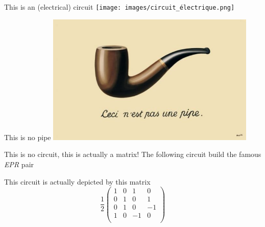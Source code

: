 \begin{frame}{This is an (electrical) circuit}
    \centering
    \texttt{[image: images/circuit\_électrique.png]}
\end{frame}

\begin{frame}{This is no pipe}
    \centering
    \includegraphics[width=10cm]{images/pipe.jpg}
\end{frame}

\begin{frame}{This is no circuit, this is actually a matrix!}
The following circuit build the famous \textit{EPR} pair
\begin{center}
\end{center}
This circuit is actually depicted by this matrix
\begin{equation*}
    \frac{1}{2}\begin{pmatrix}
                           1  &  0  &  1  &   0  \\
                           0  &  1  &  0  &   1  \\
                           0  &  1  &  0  &  -1  \\
                           1  &  0  &  -1 &   0  \\
                       \end{pmatrix}
\end{equation*}
\end{frame}


